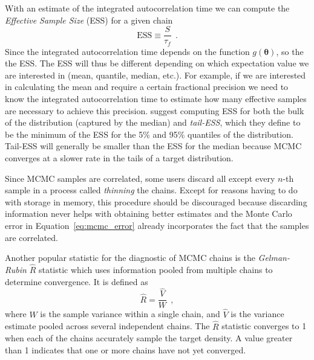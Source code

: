 \documentclass[12pt,dvipsnames]{report}
\renewcommand{\vec}[1]{\boldsymbol{\mathbf{#1}}}
\newcommand{\hquad}{~~}
\begin{document}
With an estimate of the integrated autocorrelation time we can compute the 
\emph{Effective Sample Size} (ESS) for a given chain \citep{sokal1997}
\begin{equation}
\mathrm{ESS}\equiv\frac{S}{\tau_f}
\hquad.
\end{equation}
Since the integrated autocorrelation time depends on the function 
$g(\vec\theta)$, so the the ESS. The ESS will thus be different depending on which 
expectation value we are interested in (mean, quantile, median, etc.).
For example, if we are interested in calculating the mean and require a certain
fractional precision we need to know the integrated autocorrelation time to estimate 
how many effective samples are necessary to achieve this precision.
\citet{arXiv:1903.08008} suggest computing ESS for both the bulk of the distribution 
(captured by the median) and \emph{tail-ESS}, which they define to be the minimum 
of the ESS for the 5\% and 95\% quantiles of the distribution. Tail-ESS will generally 
be smaller  than the ESS for the median because MCMC converges at a slower rate 
in the tails of a target distribution.

Since MCMC samples are correlated, some users discard all except every $n$-th sample in a process called
\emph{thinning} the chains. Except for reasons having to do with storage in memory, this
procedure should be discouraged because discarding information never helps with obtaining
better estimates and the Monte Carlo error in Equation~\ref{eq:mcmc_error} 
already incorporates the fact that the samples are correlated.

Another popular statistic for the diagnostic of MCMC chains is the
\emph{Gelman-Rubin} $\hat R$ statistic \citep{1992StaSc...7..457G} which uses 
information pooled from multiple chains to determine convergence. It is 
defined as
\begin{equation}
    \hat R= \frac{\hat V}{W}
    \hquad,
\end{equation}
where $W$ is the sample variance within a single chain, and $\hat V$ is the
variance estimate pooled across several independent chains.
The $\hat R$ statistic converges to 1 when each of the chains accurately 
sample the target density. A value greater than 1 indicates that one or more 
chains have not yet converged.
\end{document}
